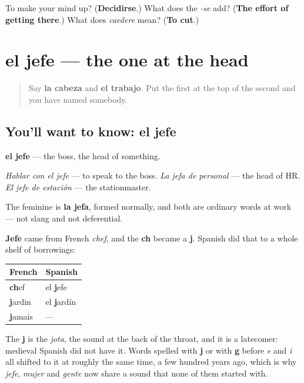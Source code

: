 \begin{tcolorbox}[breakable,colback=teal!4,colframe=teal!35!black,title={Before you move on}]
To make your mind up? (\textbf{Decidirse}.) What does the \emph{-se} add? (\textbf{The effort of getting there}.) What does \emph{caedere} mean? (\textbf{To cut}.)
\end{tcolorbox}
\section[el jefe]{el jefe — the one at the head}

\label{lesson:ES-C462-jefe}



\begin{quote}
Say \textbf{la cabeza} and \textbf{el trabajo}. Put the first at the top of the second and you have named somebody.
\end{quote}

\subsection*{You'll want to know: el jefe}
\textbf{el jefe} — the boss, the head of something.

\emph{Hablar con el jefe} — to speak to the boss. \emph{La jefa de personal} — the head of HR. \emph{El jefe de estación} — the stationmaster.

The feminine is \textbf{la jefa}, formed normally, and both are ordinary words at work — not slang and not deferential.

\begin{grammarlens}[title={Grammar Lens: the j that used to be something else}]
\textbf{Jefe} came from French \emph{chef}, and the \textbf{ch} became a \textbf{j}. Spanish did that to a whole shelf of borrowings:

\noindent
\begin{tabularx}{\linewidth}{@{}>{\raggedright\arraybackslash}X>{\raggedright\arraybackslash}X@{}}
\toprule
\textbf{French} & \textbf{Spanish} \\
\midrule
\textbf{ch}ef & el \textbf{j}efe \\
\textbf{j}ardin & el \textbf{j}ardín \\
\textbf{j}amais & — \\
\bottomrule
\end{tabularx}

The \textbf{j} is the \emph{jota}, the sound at the back of the throat, and it is a latecomer: medieval Spanish did not have it. Words spelled with \textbf{j} or with \textbf{g} before \emph{e} and \emph{i} all shifted to it at roughly the same time, a few hundred years ago, which is why \emph{jefe}, \emph{mujer} and \emph{gente} now share a sound that none of them started with.
\end{grammarlens}

